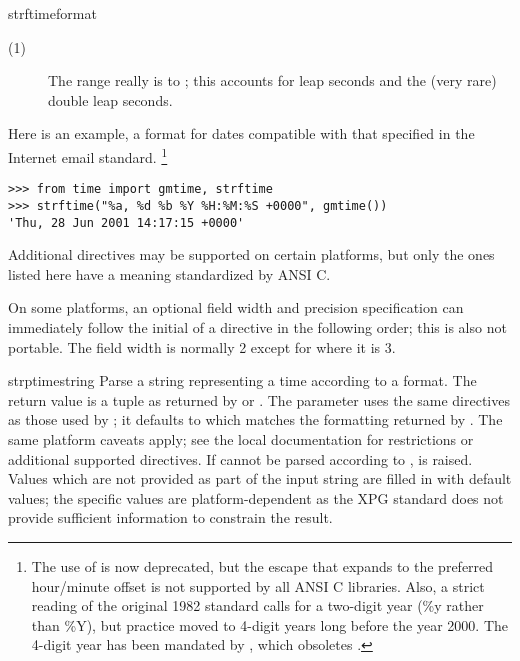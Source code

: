 \begin{funcdesc}{strftime}{format}
\begin{description}
  \item[(1)]
    The range really is  to ; this accounts for leap
    seconds and the (very rare) double leap seconds.
\end{description}

Here is an example, a format for dates compatible with that specified 
in the  Internet email standard.
	\footnote{The use of  is now
	deprecated, but the  escape that expands to the preferred 
	hour/minute offset is not supported by all ANSI C libraries. Also,
	a strict reading of the original 1982  standard calls for
	a two-digit year (\%y rather than \%Y), but practice moved to
	4-digit years long before the year 2000.  The 4-digit year has
        been mandated by , which obsoletes .}

\begin{verbatim}
>>> from time import gmtime, strftime
>>> strftime("%a, %d %b %Y %H:%M:%S +0000", gmtime())
'Thu, 28 Jun 2001 14:17:15 +0000'
\end{verbatim}

Additional directives may be supported on certain platforms, but
only the ones listed here have a meaning standardized by ANSI C.

On some platforms, an optional field width and precision
specification can immediately follow the initial \character{\%} of a
directive in the following order; this is also not portable.
The field width is normally 2 except for  where it is 3.
\end{funcdesc}

\begin{funcdesc}{strptime}{string}
Parse a string representing a time according to a format.  The return 
value is a tuple as returned by  or
.  The  parameter uses the same
directives as those used by ; it defaults to
 which matches the formatting
returned by .  The same platform caveats apply; see
the local \UNIX{} documentation for restrictions or additional
supported directives.  If  cannot be parsed according to
,  is raised.  Values which are not
provided as part of the input string are filled in with default
values; the specific values are platform-dependent as the XPG standard
does not provide sufficient information to constrain the result.
\end{funcdesc}

